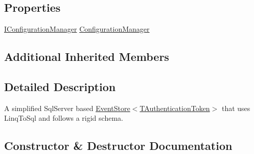 \subsection*{Properties}
\begin{DoxyCompactItemize}
\item 
\hyperlink{interfaceCqrs_1_1Configuration_1_1IConfigurationManager}{I\+Configuration\+Manager} \hyperlink{classCqrs_1_1Events_1_1SqlEventStore_ac74de2a6905b38d167bcb23055e19b3d_ac74de2a6905b38d167bcb23055e19b3d}{Configuration\+Manager}
\end{DoxyCompactItemize}
\subsection*{Additional Inherited Members}


\subsection{Detailed Description}
A simplified Sql\+Server based \hyperlink{classCqrs_1_1Events_1_1EventStore_a6346cb2aea4c5b4e740dc6cfb15abab8_a6346cb2aea4c5b4e740dc6cfb15abab8}{Event\+Store$<$\+T\+Authentication\+Token$>$} that uses Linq\+To\+Sql and follows a rigid schema. 



\subsection{Constructor \& Destructor Documentation}
\mbox{\label{classCqrs_1_1Events_1_1SqlEventStore_a15df78a1b12d2e3035b9715e9bfc8535_a15df78a1b12d2e3035b9715e9bfc8535}} 
